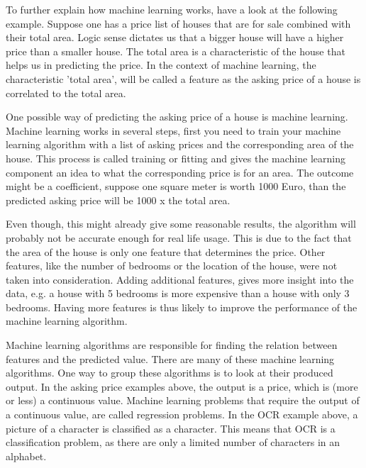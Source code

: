 \npar

To further explain how machine learning works, have a look at the following example. Suppose one has a price list of houses that are for sale combined with their total area. Logic sense dictates us that a bigger house will have a higher price than a smaller house. The total area is a characteristic of the house that helps us in predicting the price. In the context of machine learning, the characteristic 'total area', will be called a feature as the asking price of a house is correlated to the total area. 

\npar

One possible way of predicting the asking price of a house is machine learning. Machine learning works in several steps, first you need to train your machine learning algorithm with a list of asking prices and the corresponding area of the house. This process is called training or fitting and gives the machine learning component an idea to what the corresponding price is for an area. The outcome might be a coefficient, suppose one square meter is worth 1000 Euro, than the predicted asking price will be 1000 x the total area.

\npar

Even though, this might already give some reasonable results, the algorithm will probably not be accurate enough for real life usage. This is due to the fact that the area of the house is only one feature that determines the price. Other features, like the number of bedrooms or the location of the house, were not taken into consideration. Adding additional features, gives more insight into the data, e.g. a house with 5 bedrooms is more expensive than a house with only 3 bedrooms. Having more features is thus likely to improve the performance of the machine learning algorithm.

\npar

Machine learning algorithms are responsible for finding the relation between features and the predicted value. There are many of these machine learning algorithms. One way to group these algorithms is to look at their produced output\citep{prml}. In the asking price examples above, the output is a price, which is (more or less) a continuous value. Machine learning problems that require the output of a continuous value, are called regression problems. In the OCR example above, a picture of a character is classified as a character. This means that OCR is a classification problem, as there are only a limited number of characters in an alphabet.

